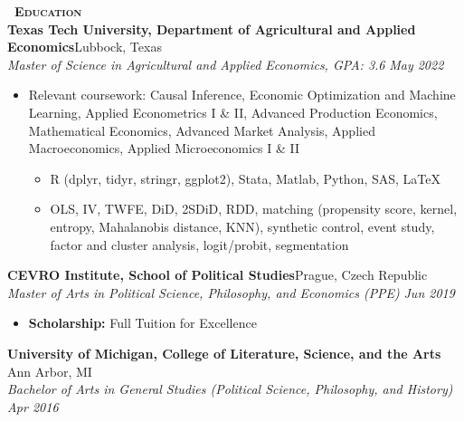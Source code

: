 \documentclass[a4paper,11pt]{article}
\newcommand{\header} [1] {
    \vspace{0.5mm}
    {\textsc{\textbf{\large{\xrfill[0.5ex]{0.5pt}~#1~\xrfill[0.5ex]{0.5pt}}}}} %
}
\begin{document}
\header{Education} \\
\vspace{0.5mm}
\textbf{Texas Tech University, Department of Agricultural and Applied Economics}\hfill Lubbock, Texas\\
\textit{Master of Science in Agricultural and Applied Economics, GPA: 3.6} \hfill  \textit{May 2022} \\
\begin{itemize}
    \item Relevant coursework: Causal Inference, Economic Optimization and Machine Learning, Applied Econometrics I \& II, Advanced Production Economics, Mathematical Economics, Advanced Market Analysis, Applied Macroeconomics, Applied Microeconomics I \& II
    \begin{itemize}
        \item R (dplyr, tidyr, stringr, ggplot2), Stata, Matlab, Python, SAS, \LaTeX
        \item OLS, IV, TWFE, DiD, 2SDiD, RDD, matching (propensity score, kernel, entropy, Mahalanobis distance,  KNN), synthetic control, event study, factor and cluster analysis, logit/probit, segmentation
    \end{itemize}
\end{itemize}
\vspace{0.5mm}

\textbf{CEVRO Institute, School of Political Studies}\hfill Prague, Czech Republic\\
\textit{Master of Arts in Political Science, Philosophy, and Economics (PPE)} \hfill  \textit{Jun 2019}\\
\begin{itemize}
    \item \textbf{Scholarship:} Full Tuition for Excellence
\end{itemize}
\vspace{0.5mm}

\textbf{University of Michigan, College of Literature, Science, and the Arts} \hfill Ann Arbor, MI\\
\textit{Bachelor of Arts in General Studies (Political Science, Philosophy, and History)} \hfill  \textit{Apr 2016}\\

\vspace{0.5mm}
\end{document}
